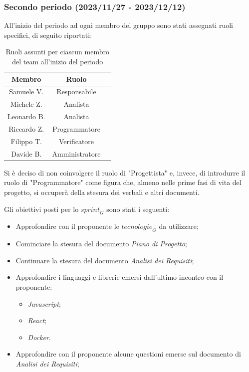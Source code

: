 \subsubsection{Secondo periodo (2023/11/27 - 2023/12/12)}

All'inizio del periodo ad ogni membro del gruppo sono stati assegnati ruoli specifici, di seguito riportati:
\begin{table}[H]
\centering
\begin{tabular}{|c|c|c|}
\hline
\textbf{Membro} & \textbf{Ruolo} \\
\hline
Samuele V. & Responsabile \\
\hline
Michele Z. & Analista \\
\hline
Leonardo B. & Analista \\
\hline
Riccardo Z. & Programmatore \\
\hline
Filippo T. & Verificatore \\
\hline
Davide B. & Amministratore \\
\hline
\end{tabular}
\caption{Ruoli assunti per ciascun membro del team all'inizio del periodo}
\end{table}
Si è deciso di non coinvolgere il ruolo di "Progettista"  e, invece, di introdurre il ruolo di "Programmatore" come figura che, almeno nelle prime fasi di vita del progetto, si occuperà della stesura dei verbali e altri documenti.

Gli obiettivi posti per lo $\textit{sprint}_G$ sono stati i seguenti:
\begin{itemize}
    \item Approfondire con il proponente le $\textit{tecnologie}_G$ da utilizzare;
    \item Cominciare la stesura del documento \emph{Piano di Progetto};
    \item Continuare la stesura del documento \emph{Analisi dei Requisiti};
    \item Approfondire i linguaggi e librerie emersi dall'ultimo incontro con il proponente:
    \begin{itemize}
        \item \emph{Javascript};
        \item \emph{React};
        \item \emph{Docker}.
    \end{itemize}
    \item Approfondire con il proponente alcune questioni emerse sul documento di \emph{Analisi dei Requisiti};
\end{itemize}

